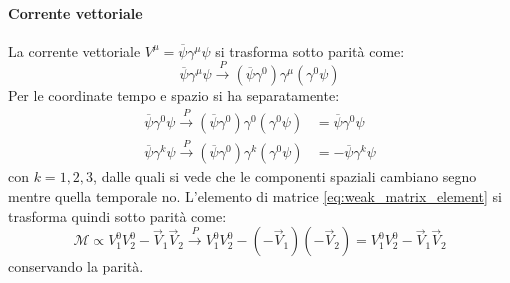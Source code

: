 \documentclass{subnucbo}
\begin{document}
\paragraph{Corrente vettoriale} La corrente vettoriale $V ^ { \mu } = \overline { \psi } \gamma ^ { \mu } \psi$ si trasforma sotto parità come:
\begin{equation}
        \overline { \psi } \gamma ^ { \mu } \psi \stackrel { P } { \rightarrow } \left( \overline { \psi } \gamma ^ { 0 } \right) \gamma ^ { \mu } \left( \gamma ^ { 0 } \psi \right)
\end{equation}
Per le coordinate tempo e spazio si ha separatamente:
\begin{equation}
        \begin{aligned}
                \overline { \psi } \gamma ^ { 0 } \psi \stackrel { P } { \rightarrow } \left( \overline { \psi } \gamma ^ { 0 } \right) \gamma ^ { 0 } \left( \gamma ^ { 0 } \psi \right) & = \overline { \psi } \gamma ^ { 0 } \psi \\ \overline { \psi } \gamma ^ { k } \psi \stackrel { P } { \rightarrow } \left( \overline { \psi } \gamma ^ { 0 } \right) \gamma ^ { k } \left( \gamma ^ { 0 } \psi \right) & = - \overline { \psi } \gamma ^ { k } \psi
        \end{aligned}
\end{equation}
con $k=1,2,3$, dalle quali si vede che le componenti spaziali cambiano segno mentre quella temporale no. L'elemento di matrice \ref{eq:weak_matrix_element} si trasforma quindi sotto parità come:
\begin{equation}
        \mathcal{M} \propto V _ { 1 } ^ { 0 } V _ { 2 } ^ { 0 } - \vec { V } _ { 1 } \vec { V } _ { 2 } \stackrel { P } { \rightarrow } V _ { 1 } ^ { 0 } V _ { 2 } ^ { 0 } - \left( - \vec { V } _ { 1 } \right) \left( - \vec { V } _ { 2 } \right) = V _ { 1 } ^ { 0 } V _ { 2 } ^ { 0 } - \vec { V } _ { 1 } \vec { V } _ { 2 }
\end{equation}
conservando la parità.
\end{document}

